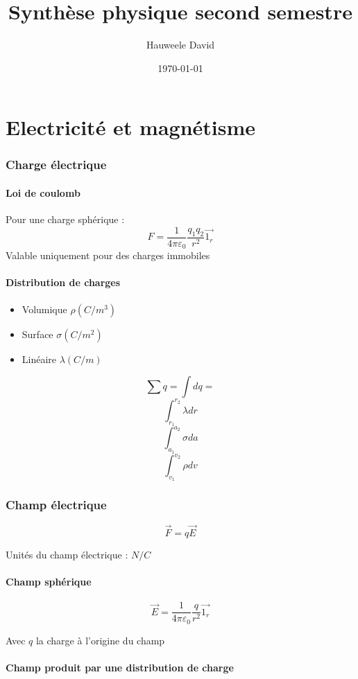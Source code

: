 \documentclass[a4paper,10pt,openright,titlepage]{report}
\title{Synthèse physique second semestre}
\author{Hauweele David}
\date{\today}
\begin{document}
\maketitle
\tableofcontents
\newpage

\part{Electricité et magnétisme}

\section{Charge électrique}
\subsection{Loi de coulomb}
Pour une charge sphérique :
$$F=\frac{1}{4 \pi \varepsilon_0} \frac{q_1 q_2}{r^2} \vec {1_r}$$
Valable uniquement pour des charges immobiles

\subsection{Distribution de charges}

\begin{itemize}
\item{Volumique $\rho (C/m^3)$}
\item{Surface $\sigma (C/m^2)$}
\item{Linéaire $\lambda (C/m)$}
\end{itemize}

$$\sum q = \int dq =$$
$$\int_{r_1}^{r_2} \lambda dr$$
$$\int_{a_1}^{a_2} \sigma da$$
$$\int_{v_1}^{v_2} \rho dv$$

\section{Champ électrique}
$$\vec F = q \vec E$$

Unités du champ électrique : $N/C$

\subsection{Champ sphérique}

$$\vec E = \frac{1}{4 \pi \varepsilon_0} \frac{q}{r^2} \vec {1_r}$$

Avec $q$ la charge à l'origine du champ

\subsection{Champ produit par une distribution de charge}
\end{document}
